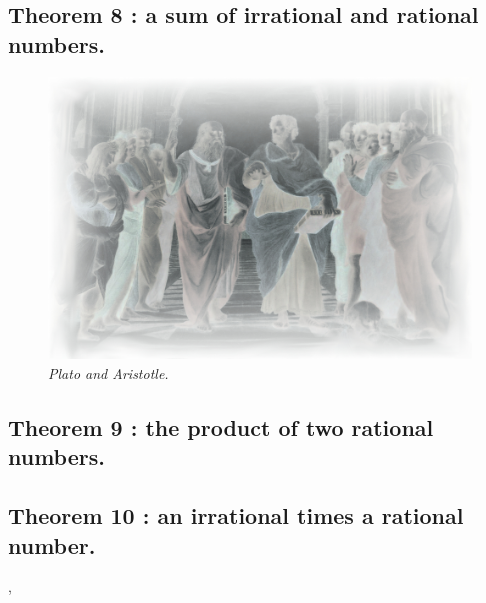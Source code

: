 \documentclass[preview]{standalone}
\begin{document}
\subsection[A sum of irrational and rational numbers.]{\color{section} Theorem 8 \color{black} : a sum of irrational and rational numbers.}

\begin{figure}[h!]
    \centering
    \includegraphics[width=12.5cm]{../resources/jpg/1.6.introduction.to.proofs/plato-republic.jpg}
    \caption*{\emph{Plato and Aristotle.}}
\end{figure}


\subsection[The product of two rational numbers.]{\color{section} Theorem 9 \color{black} : the product of two rational numbers.}

\pagebreak


\subsection[An irrational times a rational number.]{\color{section} Theorem 10 \color{black} : an irrational times a rational number.}

\sep


\end{document}
